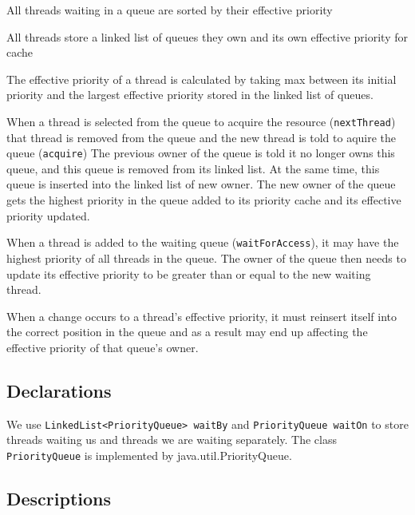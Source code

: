 \documentclass{article}
\begin{document}
\begin{spacing}{1.1}
\begin{asparaitem}
\item All threads waiting in a queue are sorted by their effective priority\\
\item All threads store a linked list of queues they own and its own effective priority for cache\\
\item The effective priority of a thread is calculated by taking max between its initial priority and the largest effective priority stored in the linked list of queues.\\
\item When a thread is selected from the queue to acquire the resource (\texttt{nextThread}) that thread is removed from the queue and the new thread is told to aquire the queue (\texttt{acquire}) The previous owner of the queue is told it no longer owns this queue, and this queue is removed from its linked list. At the same time, this queue is inserted into the linked list of new owner. The new owner of the queue gets the highest priority in the queue added to its priority cache and its effective priority updated. \\
\item When a thread is added to the waiting queue (\texttt{waitForAccess}), it may have the highest priority of all threads in the queue. The owner of the queue then needs to update its effective priority to be greater than or equal to the new waiting thread.\\
\item When a change occurs to a thread's effective priority, it must reinsert itself into the correct position in the queue and as a result may end up affecting the effective priority of that queue's owner.
\end{asparaitem}

\subsection{Declarations}

We use \texttt{LinkedList<PriorityQueue> waitBy} and \texttt{PriorityQueue waitOn} to store threads waiting us and threads we are waiting separately. The class \texttt{PriorityQueue} is implemented by java.util.PriorityQueue.

\subsection{Descriptions}


\end{spacing}
\end{document}
